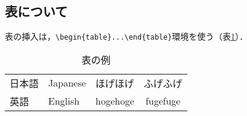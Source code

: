\subsection{表について}
表の挿入は，\verb|\begin{table}...\end{table}|環境を使う（表\ref{tab:sample}）．

\begin{table}[t]
\centering
\caption{表の例}
\label{tab:sample}
\begin{tabular}{llcc}
\hline
日本語 & Japanese & ほげほげ & ふげふげ \\
英語 & English & hogehoge & fugefuge \\
\hline
\end{tabular}
\end{table}